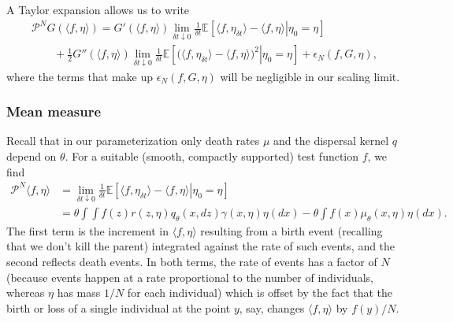\documentclass[12pt]{article}
\newcommand{\IE}{\mathbb E}
\newcommand{\Pgen}{\mathcal{P}}    %
\begin{document}
A Taylor expansion allows us to write
\begin{multline*}
    \Pgen^N
    G(\langle f,\eta \rangle)
    =
    G'(\langle f, \eta \rangle)
    \lim_{\delta t\downarrow 0} \frac{1}{\delta t}
    \IE\left[
        \left. \langle f, \eta_{\delta t} \rangle
        -
        \langle f, \eta \rangle
        \right| \eta_0=\eta
    \right]
    \\
    \qquad {}
    + \frac{1}{2}
        G''(\langle f,\eta\rangle)
    \lim_{\delta t\downarrow 0}\frac{1}{\delta t}
    \IE\left[
        \left.\big(\langle f,\eta_{\delta t}\rangle
        -
        \langle f, \eta\rangle\big)^2 \right|\eta_0=\eta
    \right]
    +
    \epsilon_N(f, G, \eta),
\end{multline*}
where the terms that make up 
$\epsilon_N(f, G, \eta)$
will be negligible in our scaling limit. 

\subsubsection*{Mean measure}

Recall that in our parameterization only death rates $\mu$
and the dispersal kernel $q$ depend on $\theta$.
For a suitable (smooth, compactly supported) test function $f$, we find
\begin{equation} \label{mean measure}
    \begin{split}
    \Pgen^N \langle f, \eta \rangle
    &=
    \lim_{\delta t\downarrow 0} \frac{1}{\delta t}
    \IE\left[ \left.
        \langle f, \eta_{\delta t} \rangle
        -
        \langle f, \eta\rangle
        \right| \eta_0 = \eta
    \right]
    \\
    &=
    \theta \int
        \int f(z) r(z,\eta) q_\theta(x,dz)
    \gamma(x, \eta) \eta(dx)
    -
    \theta \int f(x)\mu_\theta(x, \eta)
    \eta(dx).
    \end{split}
\end{equation}
The first term is the increment in $\langle f,\eta\rangle$
resulting from a birth event (recalling that
we don't kill the parent) integrated against the rate of such events,
and the second reflects death events.
In both terms,
the rate of events has a factor of $N$ (because events happen at a rate 
proportional to the number of individuals,
whereas $\eta$ has mass $1/N$ for each individual)
which is offset by the fact that  
the birth or loss of a single 
individual at the point $y$, say, changes $\langle f,\eta\rangle$
by $f(y)/N$.
\end{document}
